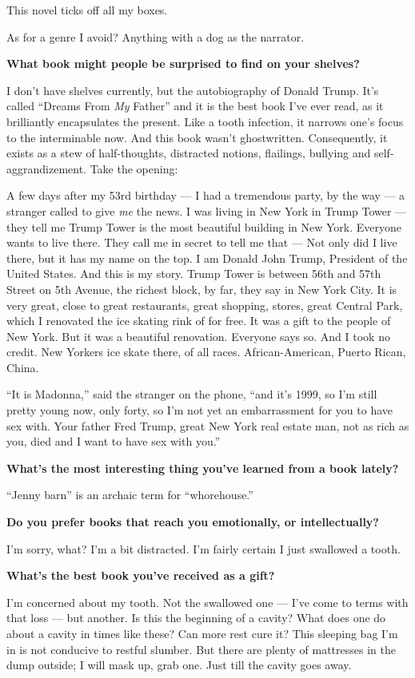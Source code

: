 This novel ticks off all my boxes.

As for a genre I avoid? Anything with a dog as the narrator.

\textbf{What book might people be surprised to find on your shelves?}

I don't have shelves currently, but the autobiography of Donald Trump.
It's called ``Dreams From \emph{My} Father'' and it is the best book
I've ever read, as it brilliantly encapsulates the present. Like a tooth
infection, it narrows one's focus to the interminable now. And this book
wasn't ghostwritten. Consequently, it exists as a stew of half-thoughts,
distracted notions, flailings, bullying and self-aggrandizement. Take
the opening:

A few days after my 53rd birthday --- I had a tremendous party, by the
way --- a stranger called to give \emph{me} the news. I was living in
New York in Trump Tower --- they tell me Trump Tower is the most
beautiful building in New York. Everyone wants to live there. They call
me in secret to tell me that --- Not only did I live there, but it has
my name on the top. I am Donald John Trump, President of the United
States. And this is my story. Trump Tower is between 56th and 57th
Street on 5th Avenue, the richest block, by far, they say in New York
City. It is very great, close to great restaurants, great shopping,
stores, great Central Park, which I renovated the ice skating rink of
for free. It was a gift to the people of New York. But it was a
beautiful renovation. Everyone says so. And I took no credit. New
Yorkers ice skate there, of all races. African-American, Puerto Rican,
China.

``It is Madonna,'' said the stranger on the phone, ``and it's 1999, so
I'm still pretty young now, only forty, so I'm not yet an embarrassment
for you to have sex with. Your father Fred Trump, great New York real
estate man, not as rich as you, died and I want to have sex with you.''

\textbf{What's the most interesting thing you've learned from a book
lately?}

``Jenny barn'' is an archaic term for ``whorehouse.''

\textbf{Do you prefer books that reach you emotionally, or
intellectually?}

I'm sorry, what? I'm a bit distracted. I'm fairly certain I just
swallowed a tooth.

\textbf{What's the best book you've received as a gift?}

I'm concerned about my tooth. Not the swallowed one --- I've come to
terms with that loss --- but another. Is this the beginning of a cavity?
What does one do about a cavity in times like these? Can more rest cure
it? This sleeping bag I'm in is not conducive to restful slumber. But
there are plenty of mattresses in the dump outside; I will mask up, grab
one. Just till the cavity goes away.

